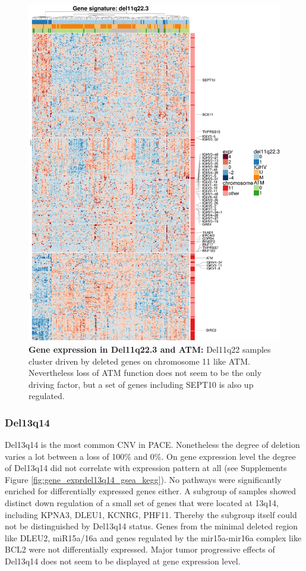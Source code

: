 \begin{figure}
	\centering
	\includegraphics[width=\columnwidth]{./Figures/gene_exprdel11q22_gsea_Hallmark.pdf}
	\caption{\textbf{Gene expression in Del11q22.3 and ATM:} Del11q22 samples cluster driven by deleted genes on chromosome 11 like ATM. Nevertheless loss of ATM function does not seem to be the only driving factor, but a set of genes including SEPT10 is also up regulated.}
	\label{fig:gene_exprdel11q22.3_gsea_hallmark}
\end{figure}

\FloatBarrier



\subsubsection{Del13q14}
Del13q14 is the most common CNV in PACE. Nonetheless the degree of deletion varies a lot between a loss of 100\% and 0\%. On gene expression level the degree of Del13q14 did not correlate with expression pattern at all (see Supplements Figure \ref{fig:gene_exprdel13q14_gsea_kegg}). No pathways were significantly enriched for differentially expressed genes either. A subgroup of samples showed distinct down regulation of a small set of genes that were located at 13q14, including KPNA3, DLEU1, KCNRG, PHF11. Thereby the subgroup itself could not be distinguished by Del13q14 status. Genes from the minimal deleted region like DLEU2, miR15a/16a and genes regulated by the mir15a-mir16a complex like BCL2 were not differentially expressed. Major tumor progressive effects of Del13q14 does not seem to be displayed at gene expression level. 


